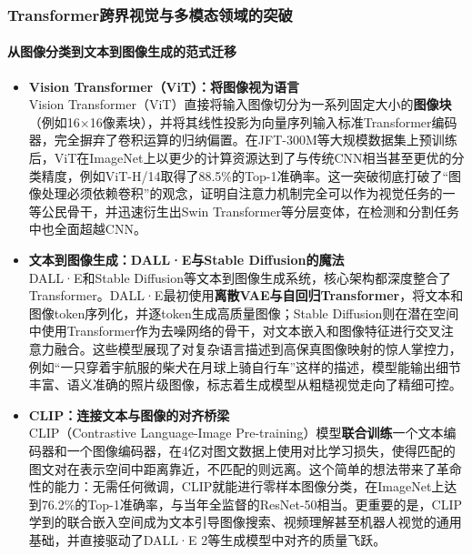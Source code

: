 \documentclass[11pt]{beamer}
\begin{document}
\begin{frame}
\frametitle{Transformer跨界视觉与多模态领域的突破}
\framesubtitle{从图像分类到文本到图像生成的范式迁移}

\begin{itemize}
    \item \textbf{Vision Transformer（ViT）：将图像视为语言} \\
    Vision Transformer（ViT）直接将输入图像切分为一系列固定大小的\textbf{图像块}（例如16×16像素块），并将其线性投影为向量序列输入标准Transformer编码器，完全摒弃了卷积运算的归纳偏置。在JFT-300M等大规模数据集上预训练后，ViT在ImageNet上以\alert{更少的计算资源}达到了与传统CNN相当甚至更优的分类精度，例如ViT-H/14取得了88.5\%的Top-1准确率。这一突破彻底打破了“图像处理必须依赖卷积”的观念，证明自注意力机制完全可以作为视觉任务的一等公民骨干，并迅速衍生出Swin Transformer等分层变体，在检测和分割任务中也全面超越CNN。

    \item \textbf{文本到图像生成：DALL·E与Stable Diffusion的魔法} \\
    DALL·E和Stable Diffusion等文本到图像生成系统，核心架构都深度整合了Transformer。DALL·E最初使用\textbf{离散VAE与自回归Transformer}，将文本和图像token序列化，并逐token生成高质量图像；Stable Diffusion则在潜在空间中使用Transformer作为去噪网络的骨干，对文本嵌入和图像特征进行交叉注意力融合。这些模型展现了对\alert{复杂语言描述}到高保真图像映射的惊人掌控力，例如“一只穿着宇航服的柴犬在月球上骑自行车”这样的描述，模型能输出细节丰富、语义准确的照片级图像，标志着生成模型从粗糙视觉走向了精细可控。

    \item \textbf{CLIP：连接文本与图像的对齐桥梁} \\
    CLIP（Contrastive Language-Image Pre-training）模型\textbf{联合训练}一个文本编码器和一个图像编码器，在4亿对图文数据上使用\alert{对比学习}损失，使得匹配的图文对在表示空间中距离靠近，不匹配的则远离。这个简单的想法带来了革命性的能力：无需任何微调，CLIP就能进行零样本图像分类，在ImageNet上达到76.2\%的Top-1准确率，与当年全监督的ResNet-50相当。更重要的是，CLIP学到的联合嵌入空间成为文本引导图像搜索、视频理解甚至机器人视觉的通用基础，并直接驱动了DALL·E 2等生成模型中对齐的质量飞跃。
\end{itemize}
\end{frame}
\end{document}
